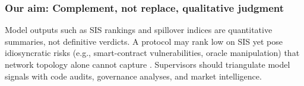 \subsubsection{Our aim: Complement, not replace, qualitative judgment}
Model outputs such as SIS rankings and spillover indices are quantitative summaries, not definitive verdicts. A protocol may rank low on SIS yet pose idiosyncratic risks (e.g., smart-contract vulnerabilities, oracle manipulation) that network topology alone cannot capture \citep{DuleyEtAl2023Oracle,gogol2024sokdecentralizedfinancedefi}. Supervisors should triangulate model signals with code audits, governance analyses, and market intelligence.

